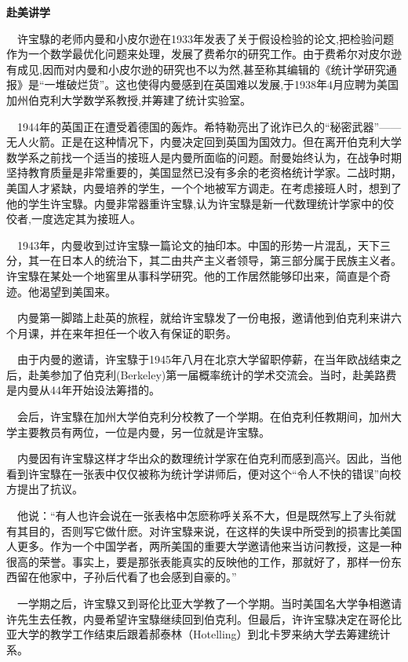 \begin{frame}
	\textbf{赴美讲学}
	
	$\quad$许宝騄的老师内曼和小皮尔逊在1933年发表了关于假设检验的论文,把检验问题作为一个数学最优化问题来处理，发展了费希尔的研究工作。由于费希尔对皮尔逊有成见,因而对内曼和小皮尔逊的研究也不以为然,甚至称其编辑的《统计学研究通报》是“一堆破烂货”。这也使得内曼感到在英国难以发展,于1938年4月应聘为美国加州伯克利大学数学系教授,并筹建了统计实验室。
	
	$\quad$1944年的英国正在遭受着德国的轰炸。希特勒亮出了讹诈已久的“秘密武器”——无人火箭。正是在这种情况下，内曼决定回到英国为国效力。但在离开伯克利大学数学系之前找一个适当的接班人是内曼所面临的问题。耐曼始终认为，在战争时期坚持教育质量是非常重要的，美国显然已没有多余的老资格统计学家。二战时期，美国人才紧缺，内曼培养的学生，一个个地被军方调走。在考虑接班人时，想到了他的学生许宝騄。内曼非常器重许宝騄,认为许宝騄是新一代数理统计学家中的佼佼者,一度选定其为接班人。
	
\end{frame}

\begin{frame}
	$\quad$1943年，内曼收到过许宝騄一篇论文的抽印本。中国的形势一片混乱，天下三分，其一在日本人的统治下，其二由共产主义者领导，第三部分属于民族主义者。许宝騄在某处一个地窖里从事科学研究。他的工作居然能够印出来，简直是个奇迹。他渴望到美国来。
	
	$\quad$内曼第一脚踏上赴英的旅程，就给许宝騄发了一份电报，邀请他到伯克利来讲六个月课，并在来年担任一个收入有保证的职务。
	
	$\quad$由于内曼的邀请，许宝騄于1945年八月在北京大学留职停薪，在当年欧战结束之后，赴美参加了伯克利(Berkeley)第一届概率统计的学术交流会。当时，赴美路费是内曼从44年开始设法筹措的。
	
	$\quad$会后，许宝騄在加州大学伯克利分校教了一个学期。在伯克利任教期间，加州大学主要教员有两位，一位是内曼，另一位就是许宝騄。
	
\end{frame}

\begin{frame}
	$\quad$内曼因有许宝騄这样才华出众的数理统计学家在伯克利而感到高兴。因此，当他看到许宝騄在一张表中仅仅被称为统计学讲师后，便对这个“令人不快的错误”向校方提出了抗议。
	
	$\quad$他说：“有人也许会说在一张表格中怎麽称呼关系不大，但是既然写上了头衔就有其目的，否则写它做什麽。对许宝騄来说，在这样的失误中所受到的损害比美国人更多。作为一个中国学者，两所美国的重要大学邀请他来当访问教授，这是一种很高的荣誉。事实上，要是那张表能真实的反映他的工作，那就好了，那样一份东西留在他家中，子孙后代看了也会感到自豪的。”
	
	$\quad$一学期之后，许宝騄又到哥伦比亚大学教了一个学期。当时美国名大学争相邀请许先生去任教，内曼希望许宝騄继续回到伯克利。但最后，许许宝騄决定在哥伦比亚大学的教学工作结束后跟着郝泰林（Hotelling）到北卡罗来纳大学去筹建统计系。
	
\end{frame}

